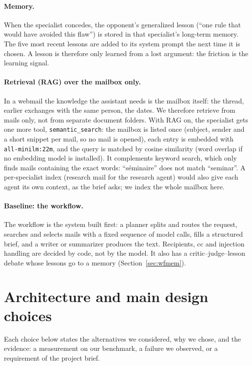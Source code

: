 \documentclass[11pt,a4paper]{article}
\newcommand{\code}[1]{\texttt{#1}}
\begin{document}
\paragraph{Memory.}
When the specialist concedes, the opponent's generalized lesson (``one rule that would have avoided this flaw'') is
stored in that specialist's long-term memory. The five most recent lessons are added to its system prompt the next
time it is chosen. A lesson is therefore only learned from a lost argument: the friction is the learning signal.

\paragraph{Retrieval (RAG) over the mailbox only.}
In a webmail the knowledge the assistant needs is the mailbox itself: the thread, earlier exchanges with the same
person, the dates. We therefore retrieve from mails only, not from separate document folders. With RAG on, the
specialist gets one more tool, \code{semantic\_search}: the mailbox is listed once (subject, sender and a short
snippet per mail, so no mail is opened), each entry is embedded with \code{all-minilm:22m}, and the query is matched
by cosine similarity (word overlap if no embedding model is installed). It complements keyword search, which only
finds mails containing the exact words: ``séminaire'' does not match ``seminar''. A per-specialist index (research
mail for the research agent) would also give each agent its own context, as the brief asks; we index the whole
mailbox here.

\paragraph{Baseline: the workflow.}
The workflow is the system built first: a planner splits and routes the request, searches and selects mails with a
fixed sequence of model calls, fills a structured brief, and a writer or summarizer produces the text. Recipients,
cc and injection handling are decided by code, not by the model. It also has a critic--judge--lesson debate whose
lessons go to a memory (Section~\ref{sec:wfmem}).

\section{Architecture and main design choices}
Each choice below states the alternatives we considered, why we chose, and the evidence: a measurement on our
benchmark, a failure we observed, or a requirement of the project brief.
\newcommand{\choice}[4]{\paragraph{#1}\emph{Alternatives:} #2\\ \emph{Why:} #3\\ \emph{Evidence:} #4}
\end{document}

